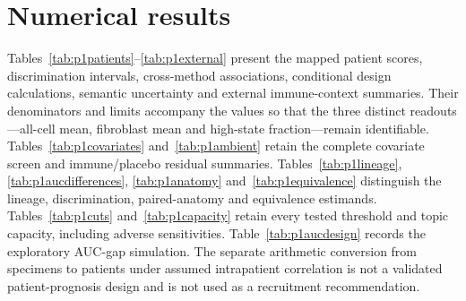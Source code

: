 \section{Numerical results}
Tables~\ref{tab:p1patients}--\ref{tab:p1external} present the mapped patient scores, discrimination intervals, cross-method associations, conditional design calculations, semantic uncertainty and external immune-context summaries. Their denominators and limits accompany the values so that the three distinct readouts---all-cell mean, fibroblast mean and high-state fraction---remain identifiable.
Tables~\ref{tab:p1covariates} and~\ref{tab:p1ambient} retain the complete covariate screen and immune/placebo residual summaries. Tables~\ref{tab:p1lineage}, \ref{tab:p1aucdifferences}, \ref{tab:p1anatomy} and~\ref{tab:p1equivalence} distinguish the lineage, discrimination, paired-anatomy and equivalence estimands. Tables~\ref{tab:p1cuts} and~\ref{tab:p1capacity} retain every tested threshold and topic capacity, including adverse sensitivities. Table~\ref{tab:p1aucdesign} records the exploratory AUC-gap simulation. The separate arithmetic conversion from specimens to patients under assumed intrapatient correlation is not a validated patient-prognosis design and is not used as a recruitment recommendation.


